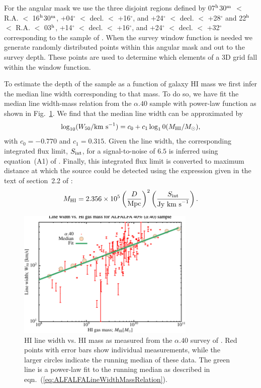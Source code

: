For the angular mask we use the three disjoint regions defined by 07$^{\rm h}$30$^{\rm m}$ $<$ R.A. $<$ 16$^{\rm h}$30$^{\rm m}$, +04$^\circ$ $<$ decl. $<$ +16$^\circ$, and +24$^\circ$ $<$ decl. $<$ +28$^\circ$ and 22$^{\rm h}$ $<$ R.A. $<$ 03$^{\rm h}$, +14$^\circ$ $<$ decl. $<$ +16$^\circ$, and +24$^\circ$ $<$ decl. $<$ +32$^\circ$ corresponding to the sample of \cite{martin_arecibo_2010}. When the survey window function is needed we generate randomly distributed points within this angular mask and out to the survey depth. These points are used to determine which elements of a 3D grid fall within the window function.

To estimate the depth of the \cite{martin_arecibo_2010} sample as a function of galaxy HI mass we first infer the median line width corresponding to that mass. To do so, we have fit the median line width-mass relation from the $\alpha.40$ sample with power-law function as shown in Fig.~\ref{fig:ALFALFALineWidthMassRelation}. We find that the median line width can be approximated by
\begin{equation}
 \log_{10} (W_{\rm 50}/\hbox{km s}^{-1}) = c_0 + c_1 \log_10(M_{\rm HI}/M_\odot),
 \label{eq:ALFALFALineWidthMassRelation}
\end{equation}
with $c_0=-0.770$ and $c_1=0.315$. Given the line width, the corresponding integrated flux limit, $S_{\rm int}$, for a signal-to-noise of $6.5$ is inferred using equation~(A1) of \cite{haynes_arecibo_2011}. Finally, this integrated flux limit is converted to maximum distance at which the source could be detected using the expression given in the text of section~2.2 of \cite{martin_arecibo_2010}:
\begin{equation}
 M_{\rm HI} = 2.356\times10^5 \left({D\over \hbox{Mpc}}\right)^2 \left({S_{\rm int}\over\hbox{Jy km s}^{-1}}\right).
\end{equation}

\begin{figure}
 \includegraphics[width=85mm,trim=0mm 0mm 0mm 4mm,clip]{Plots/DataAnalysis/alfalfaHILineWidthMassRelation.pdf}
 \caption{HI line width vs. HI mass as measured from the $\alpha.40$ survey of \protect\cite{martin_arecibo_2010}. Red points with error bars show individual measurements, while the larger circles indicate the running median of these data. The green line is a power-law fit to the running median as described in eqn.~(\protect\ref{eq:ALFALFALineWidthMassRelation}).}
 \label{fig:ALFALFALineWidthMassRelation}
\end{figure}

